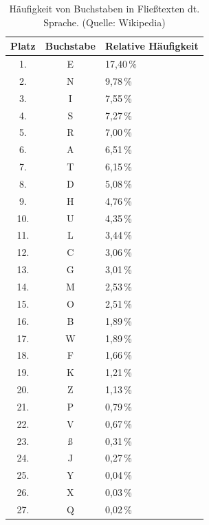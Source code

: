 \begin{table}[h!]
    \setlength{\tabcolsep}{0.5em}
    \def\arraystretch{1.5}
    \centering
    \begin{tabular}{|c|c|l|}
        \hline
        \textbf{Platz} & \textbf{Buchstabe} & \textbf{Relative Häufigkeit} \\
        \hline
        1.  & E  & 17{,}40\,\% \\  \hline
        2.  & N  & 9{,}78\,\% \\ \hline
        3.  & I  & 7{,}55\,\% \\ \hline
        4.  & S  & 7{,}27\,\% \\ \hline
        5.  & R  & 7{,}00\,\% \\ \hline
        6.  & A  & 6{,}51\,\% \\ \hline
        7.  & T  & 6{,}15\,\% \\ \hline
        8.  & D  & 5{,}08\,\% \\ \hline
        9.  & H  & 4{,}76\,\% \\ \hline
        10. & U  & 4{,}35\,\% \\ \hline
        11. & L  & 3{,}44\,\% \\ \hline
        12. & C  & 3{,}06\,\% \\ \hline
        13. & G  & 3{,}01\,\% \\ \hline
        14. & M  & 2{,}53\,\% \\ \hline
        15. & O  & 2{,}51\,\% \\ \hline
        16. & B  & 1{,}89\,\% \\ \hline
        17. & W  & 1{,}89\,\% \\ \hline
        18. & F  & 1{,}66\,\% \\ \hline
        19. & K  & 1{,}21\,\% \\ \hline
        20. & Z  & 1{,}13\,\% \\ \hline
        21. & P  & 0{,}79\,\% \\ \hline
        22. & V  & 0{,}67\,\% \\ \hline
        23. & \ss{} & 0{,}31\,\% \\ \hline
        24. & J  & 0{,}27\,\% \\ \hline
        25. & Y  & 0{,}04\,\% \\ \hline
        26. & X  & 0{,}03\,\% \\ \hline
        27. & Q  & 0{,}02\,\% \\ \hline
    \end{tabular}
    \caption{Häufigkeit von Buchstaben in Fließtexten dt. Sprache. (Quelle: Wikipedia)}
    \label{tab:bh_fliess}
\end{table}


